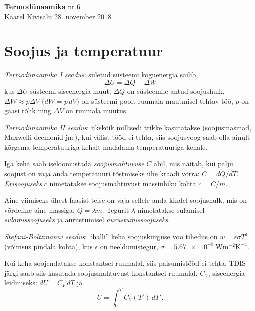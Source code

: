 \documentclass[a4paper,11pt,twocolumn]{article}
\begin{document}
{\huge \textbf{Termodünaamika} \hfill \normalsize {nr 6}} \\
{Kaarel Kivisalu \hfill 28. november 2018}

\section{Soojus ja temperatuur}
\textit{Termodünaamika I seadus}: suletud süsteemi koguenergia säilib, 
\[ \Delta U=\Delta Q-\Delta W\]
kus \( \Delta U \) süsteemi siseenergia muut, \( \Delta Q \) on süsteemile antud
soojushulk, \( \Delta W \approx p\Delta V \) (\( dW=p\,dV \)) on süsteemi poolt ruumala muutmisel tehtav töö, \( p \) on gaasi rõhk ning \( \Delta V \) on ruumala muutus.

\textit{Termodünaamika II seadus}: ükskõik millisedi trikke kasutatakse (soojusmasinad, Maxwelli deemonid jne), kui välist tööd ei tehta, siis soojusvoog saab olla ainult kõrgema temperatuuriga kehalt madalama temperatuuriga kehale.

Iga keha saab iseloomustada \textit{soojusmahtuvuse} \( C \) abil,
mis näitab, kui palju soojust on vaja anda temperatuuri tõstmiseks ühe kraadi võrra: \( C = dQ/dT \). \textit{Erisoojuseks} \( c \) nimetatakse soojusmahtuvust massiühiku kohta \( c=C/m \).

Aine viimiseks ühest faasist teise on vaja sellele anda kindel soojushulk, mis on võrdeline aine massiga: \( Q=\lambda m \). Tegurit \( \lambda \) nimetatakse sulamisel \textit{sulamissoojuseks} ja aurustumisel \textit{aurustumissoojuseks}.

\textit{Stefani-Boltzmanni seadus}: \enquote{halli} keha soojuskiirguse voo tihedus on \( w=\epsilon\sigma T^4 \) (võimsus pindala kohta), kus \( \epsilon \) on neeldumistegur, \( \sigma = \SI{5,67e-8}{\watt\metre\tothe{-2}\kelvin\tothe{-4}} \).

Kui keha soojendatakse konstantsel ruumalal, siis paisumistööd ei tehta. TDIS järgi saab siis kasutada soojusmahtuvust konstantsel ruumalal, \( C_V \), siseenergia leidmiseks: \( dU=C_V\,dT \) ja \[ U=\int_{0}^{T}C_V(T')\, dT' .\]
\end{document}
